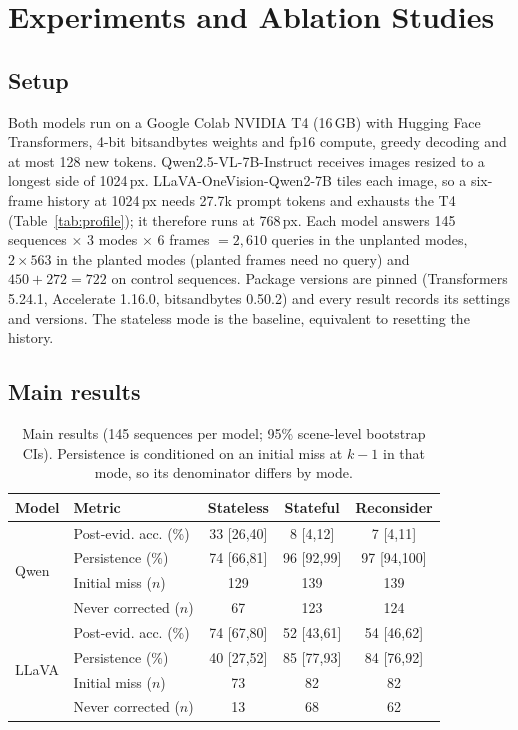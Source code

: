 \documentclass[conference]{IEEEtran}
\begin{document}
\section{Experiments and Ablation Studies}

\subsection{Setup}

Both models run on a Google Colab NVIDIA T4 (16\,GB) with Hugging Face Transformers, 4-bit bitsandbytes weights and fp16 compute, greedy decoding and at most 128 new tokens. Qwen2.5-VL-7B-Instruct receives images resized to a longest side of 1024\,px. LLaVA-OneVision-Qwen2-7B tiles each image, so a six-frame history at 1024\,px needs 27.7k prompt tokens and exhausts the T4 (Table~\ref{tab:profile}); it therefore runs at 768\,px. Each model answers 145 sequences $\times$ 3 modes $\times$ 6 frames $=2{,}610$ queries in the unplanted modes, $2\times563$ in the planted modes (planted frames need no query) and $450+272=722$ on control sequences. Package versions are pinned (Transformers 5.24.1, Accelerate 1.16.0, bitsandbytes 0.50.2) and every result records its settings and versions. The stateless mode is the baseline, equivalent to resetting the history.

\subsection{Main results}

\begin{table}[t]
\centering
\caption{Main results (145 sequences per model; 95\% scene-level bootstrap CIs). Persistence is conditioned on an initial miss at $k{-}1$ in that mode, so its denominator differs by mode.}
\label{tab:main}
\setlength{\tabcolsep}{3pt}
\begin{tabular}{@{}llccc@{}}
\toprule
Model & Metric & Stateless & Stateful & Reconsider\\
\midrule
\multirow{4}{*}{Qwen}  & Post-evid. acc. (\%) & 33 [26,40] & 8 [4,12] & 7 [4,11]\\
                       & Persistence (\%)     & 74 [66,81] & 96 [92,99] & 97 [94,100]\\
                       & Initial miss ($n$)   & 129 & 139 & 139\\
                       & Never corrected ($n$) & 67 & 123 & 124\\
\midrule
\multirow{4}{*}{LLaVA} & Post-evid. acc. (\%) & 74 [67,80] & 52 [43,61] & 54 [46,62]\\
                       & Persistence (\%)     & 40 [27,52] & 85 [77,93] & 84 [76,92]\\
                       & Initial miss ($n$)   & 73 & 82 & 82\\
                       & Never corrected ($n$) & 13 & 68 & 62\\
\bottomrule
\end{tabular}
\end{table}
\end{document}

